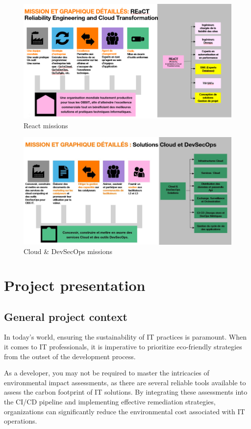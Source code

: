 \begin{figure}[H]
  \centering
  \includegraphics[width=17.5cm]{Figures/react.png}
  \caption{React missions }
\end{figure}

\begin{figure}[H]
  \centering
  \includegraphics[width=17.5cm]{Figures/mission.png}
  \caption{Cloud \& DevSecOps missions }
\end{figure}

\section{Project presentation}
\subsection{General project context}
In today's world, ensuring the sustainability of IT practices is paramount. When it comes to IT professionals, it is imperative to prioritize eco-friendly strategies from the outset of the development process.

As a developer, you may not be required to master the intricacies of environmental impact assessments, as there are several reliable tools available to assess the carbon footprint of IT solutions. By integrating these assessments into the CI/CD pipeline and implementing effective remediation strategies, organizations can significantly reduce the environmental cost associated with IT operations.

